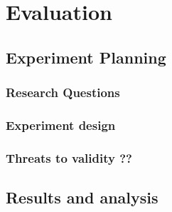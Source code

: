 \chapter{Evaluation}

\section{Experiment Planning}

\subsection{Research Questions}

\subsection{Experiment design}

\subsection{Threats to validity ??}

\section{Results and analysis}
